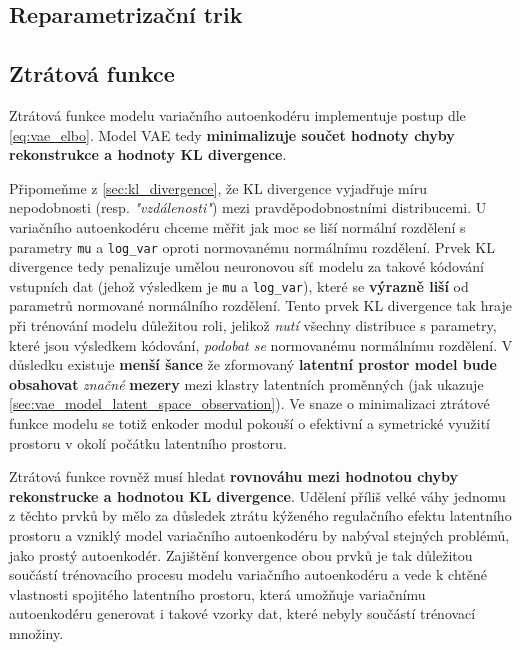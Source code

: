 \subsection{Reparametrizační trik}


\subsection{Ztrátová funkce}
Ztrátová funkce modelu variačního autoenkodéru implementuje postup dle \autoref{eq:vae_elbo}.
Model VAE tedy \textbf{minimalizuje součet hodnoty chyby rekonstrukce a hodnoty KL divergence}.

Připomeňme z \autoref{sec:kl_divergence}, že KL divergence vyjadřuje míru nepodobnosti (resp. \emph{"vzdálenosti"}) mezi pravděpodobnostními distribucemi.
U variačního autoenkodéru chceme měřit jak moc se liší normální rozdělení s parametry \lstinline{mu} a \lstinline{log_var} oproti normovanému normálnímu rozdělení.
Prvek KL divergence tedy penalizuje umělou neuronovou síť modelu za takové kódování vstupních dat (jehož výsledkem je \lstinline{mu} a \lstinline{log_var}), které se \textbf{výrazně liší} od parametrů normované normálního rozdělení.
Tento prvek KL divergence tak hraje při trénování modelu důležitou roli, jelikož \emph{nutí} všechny distribuce s parametry, které jsou výsledkem kódování, \emph{podobat se} normovanému normálnímu rozdělení. 
V důsledku existuje \textbf{menší šance} že zformovaný \textbf{latentní prostor model bude obsahovat} \emph{značné} \textbf{mezery} mezi klastry latentních proměnných (jak ukazuje \autoref{sec:vae_model_latent_space_observation}).
Ve snaze o minimalizaci ztrátové funkce modelu se totiž enkoder modul pokouší o efektivní a symetrické využití prostoru v okolí počátku latentního prostoru.

Ztrátová funkce rovněž musí hledat \textbf{rovnováhu mezi hodnotou chyby rekonstrucke a hodnotou KL divergence}.
Udělení příliš velké váhy jednomu z těchto prvků by mělo za důsledek ztrátu kýženého regulačního efektu latentního prostoru a vzniklý model variačního autoenkodéru by nabýval stejných problémů, jako prostý autoenkodér.
Zajištění konvergence obou prvků je tak důležitou součástí trénovacího procesu modelu variačního autoenkodéru a vede k chtěné vlastnosti spojitého latentního prostoru, která umožňuje variačnímu autoenkodéru generovat i takové vzorky dat, které nebyly součástí trénovací množiny.

\newpage


